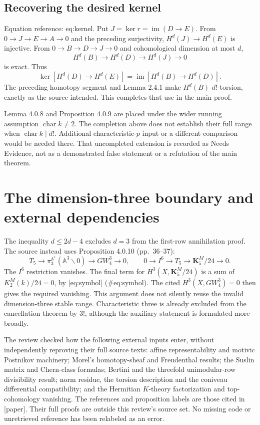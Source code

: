 \documentclass[10pt]{article}
\begin{document}
\subsection*{Recovering the desired kernel}
Equation reference: eq:kernel. Put \(J=\ker r=\operatorname{im}(D\to E)\). From \(0\to J\to E\to A\to0\) and the preceding surjectivity, \(H^d(J)\to H^d(E)\) is injective. From \(0\to B\to D\to J\to0\) and cohomological dimension at most \(d\), \[H^d(B)\longrightarrow H^d(D)\longrightarrow H^d(J)
 \longrightarrow0\] is exact. Thus \[
 \ker[H^d(D)\to H^d(E)]
   =\operatorname{im}[H^d(B)\to H^d(D)].\] The preceding homotopy segment and Lemma 2.4.1 make \(H^d(B)\) \(d!\)-torsion, exactly as the source intended. This completes that use in the main proof.\par
Lemma 4.0.8 and Proposition 4.0.9 are placed under the wider running assumption \(\operatorname{char}k\ne2\). The completion above does not establish their full range when \(\operatorname{char}k\mid d!\). Additional characteristic-\(p\) input or a different comparison would be needed there. That uncompleted extension is recorded as Needs Evidence, not as a demonstrated false statement or a refutation of the main theorem.\par
\section*{The dimension-three boundary and external dependencies}
The inequality \(d\leq2d-4\) excludes \(d=3\) from the first-row annihilation proof. The source instead uses Proposition 4.0.10 (pp. 36–37): \[T_5\longrightarrow\pi^{\mathbb A^1}_3(\mathbb A^3\smallsetminus0)
       \longrightarrow GW_4^3\longrightarrow0,
 \qquad
 0\longrightarrow I^6\longrightarrow T_5
       \longrightarrow\mathbf K_5^M/24\longrightarrow0.\] The \(I^6\) restriction vanishes. The final term for \(H^3(X,\mathbf K_5^M/24)\) is a sum of \(K_2^M(k)/24=0\), by [eq:symbol] (\#eq:symbol). The cited \(H^3(X,GW_4^3)=0\) then gives the required vanishing. This argument does not silently reuse the invalid dimension-three stable range. Characteristic three is already excluded from the cancellation theorem by \(3!\), although the auxiliary statement is formulated more broadly.\par
The review checked how the following external inputs enter, without independently reproving their full source texts: affine representability and motivic Postnikov machinery; Morel’s homotopy-sheaf and Freudenthal results; the Suslin matrix and Chern-class formulas; Bertini and the threefold unimodular-row divisibility result; norm residue, the torsion description and the coniveau differential compatibility; and the Hermitian \(K\)-theory factorization and top-cohomology vanishing. The references and proposition labels are those cited in [paper]. Their full proofs are outside this review’s source set. No missing code or unretrieved reference has been relabeled as an error.\par
\end{document}
